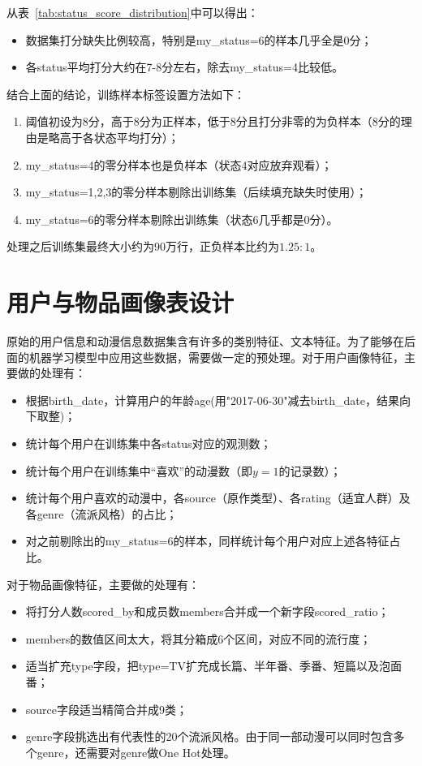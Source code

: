   从表~\ref{tab:status_score_distribution}中可以得出：
  \begin{itemize}
    \item 数据集打分缺失比例较高，特别是my\_status=6的样本几乎全是0分；
    \item 各status平均打分大约在7-8分左右，除去my\_status=4比较低。
  \end{itemize}

  结合上面的结论，训练样本标签设置方法如下：
  \begin{enumerate}
    \item 阈值初设为8分，高于8分为正样本，低于8分且打分非零的为负样本（8分的理由是略高于各状态平均打分）；
    \item my\_status=4的零分样本也是负样本（状态4对应放弃观看）；
    \item my\_status=1,2,3的零分样本剔除出训练集（后续填充缺失时使用）；
    \item my\_status=6的零分样本剔除出训练集（状态6几乎都是0分）。
  \end{enumerate}

  处理之后训练集最终大小约为90万行，正负样本比约为$1.25:1$。

  \section{用户与物品画像表设计}
  原始的用户信息和动漫信息数据集含有许多的类别特征、文本特征。为了能够在后面的机器学习模型中应用这些数据，需要做一定的预处理。对于用户画像特征，主要做的处理有：
  \begin{itemize}
    \item 根据birth\_date，计算用户的年龄age(用"2017-06-30"减去birth\_date，结果向下取整)；
    \item 统计每个用户在训练集中各status对应的观测数；
    \item 统计每个用户在训练集中“喜欢”的动漫数（即$y=1$的记录数）；
    \item 统计每个用户喜欢的动漫中，各source（原作类型）、各rating（适宜人群）及各genre（流派风格）的占比；
    \item 对之前剔除出的my\_status=6的样本，同样统计每个用户对应上述各特征占比。
  \end{itemize}

  对于物品画像特征，主要做的处理有：
  \begin{itemize}
    \item 将打分人数scored\_by和成员数members合并成一个新字段scored\_ratio；
    \item members的数值区间太大，将其分箱成6个区间，对应不同的流行度；
    \item 适当扩充type字段，把type=TV扩充成长篇、半年番、季番、短篇以及泡面番；
    \item source字段适当精简合并成9类；
    \item genre字段挑选出有代表性的20个流派风格。由于同一部动漫可以同时包含多个genre，还需要对genre做One Hot处理。
  \end{itemize}

